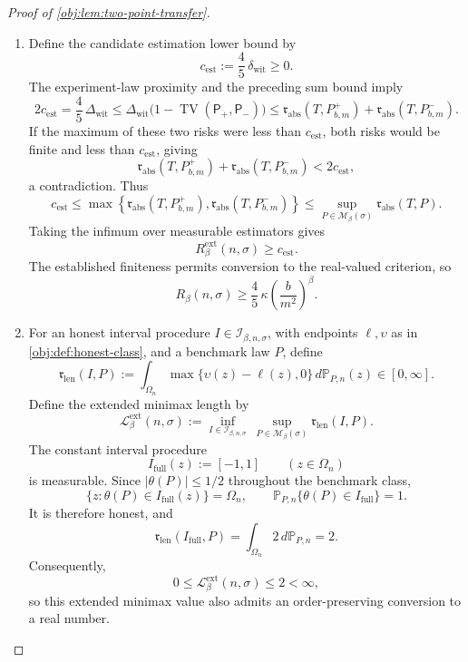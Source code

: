 \documentclass[11pt]{article}
\begin{document}
\begin{proof}[Proof of \cref{obj:lem:two-point-transfer}]
\begin{enumerate}
\item
Define the candidate estimation lower bound by
\[
c_{\mathrm{est}}:=\frac45\,\delta_{\mathrm{wit}}\ge0.
\]
The experiment-law proximity and the preceding sum bound imply
\[
2c_{\mathrm{est}}
=
\frac45\,\Delta_{\mathrm{wit}}
\le
\Delta_{\mathrm{wit}}
\bigl(1-\operatorname{TV}(\mathsf P_+,\mathsf P_-)\bigr)
\le
\mathfrak r_{\mathrm{abs}}(T,P^+_{b,m})
+
\mathfrak r_{\mathrm{abs}}(T,P^-_{b,m}).
\]
If the maximum of these two risks were less than \(c_{\mathrm{est}}\), both risks would be finite and less than \(c_{\mathrm{est}}\), giving
\[
\mathfrak r_{\mathrm{abs}}(T,P^+_{b,m})
+
\mathfrak r_{\mathrm{abs}}(T,P^-_{b,m})
<
2c_{\mathrm{est}},
\]
a contradiction. Thus
\[
c_{\mathrm{est}}
\le
\max\left\{
\mathfrak r_{\mathrm{abs}}(T,P^+_{b,m}),
\mathfrak r_{\mathrm{abs}}(T,P^-_{b,m})
\right\}
\le
\sup_{P\in\mathcal M_\beta(\sigma)}
\mathfrak r_{\mathrm{abs}}(T,P).
\]
Taking the infimum over measurable estimators gives
\[
R^{\mathrm{ext}}_\beta(n,\sigma)\ge c_{\mathrm{est}}.
\]
The established finiteness permits conversion to the real-valued criterion, so
\[
R_\beta(n,\sigma)
\ge
\frac45\,\kappa\left(\frac{b}{m^2}\right)^\beta.
\]

\item
For an honest interval procedure \(I\in\mathcal I_{\beta,n,\sigma}\), with endpoints \(\ell,\upsilon\) as in \cref{obj:def:honest-class}, and a benchmark law \(P\), define
\[
\mathfrak r_{\mathrm{len}}(I,P)
:=
\int_{\Omega_n}
\max\{\upsilon(z)-\ell(z),0\}\,d\mathbb P_{P,n}(z)
\in[0,\infty].
\]
Define the extended minimax length by
\[
\mathcal L^{\mathrm{ext}}_\beta(n,\sigma)
:=
\inf_{I\in\mathcal I_{\beta,n,\sigma}}
\ \sup_{P\in\mathcal M_\beta(\sigma)}
\mathfrak r_{\mathrm{len}}(I,P).
\]
The constant interval procedure
\[
I_{\mathrm{full}}(z):=[-1,1]
\qquad(z\in\Omega_n)
\]
is measurable. Since \(|\theta(P)|\le1/2\) throughout the benchmark class,
\[
\{z:\theta(P)\in I_{\mathrm{full}}(z)\}=\Omega_n,
\qquad
\mathbb P_{P,n}\{\theta(P)\in I_{\mathrm{full}}\}=1.
\]
It is therefore honest, and
\[
\mathfrak r_{\mathrm{len}}(I_{\mathrm{full}},P)
=
\int_{\Omega_n}2\,d\mathbb P_{P,n}
=2.
\]
Consequently,
\[
0\le\mathcal L^{\mathrm{ext}}_\beta(n,\sigma)\le2<\infty,
\]
so this extended minimax value also admits an order-preserving conversion to a real number.


\end{enumerate}
\end{proof}
\end{document}
